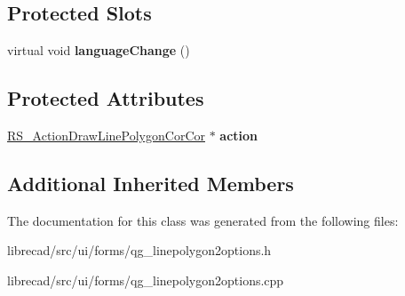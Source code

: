 \subsection*{Protected Slots}
\begin{DoxyCompactItemize}
\item 
\hypertarget{classQG__LinePolygon2Options_a90ab75736f6d2e227e90defa540c2294}{virtual void {\bfseries language\-Change} ()}\label{classQG__LinePolygon2Options_a90ab75736f6d2e227e90defa540c2294}

\end{DoxyCompactItemize}
\subsection*{Protected Attributes}
\begin{DoxyCompactItemize}
\item 
\hypertarget{classQG__LinePolygon2Options_af7e7b39e989aa9dda2ee182799a5fa7a}{\hyperlink{classRS__ActionDrawLinePolygonCorCor}{R\-S\-\_\-\-Action\-Draw\-Line\-Polygon\-Cor\-Cor} $\ast$ {\bfseries action}}\label{classQG__LinePolygon2Options_af7e7b39e989aa9dda2ee182799a5fa7a}

\end{DoxyCompactItemize}
\subsection*{Additional Inherited Members}


The documentation for this class was generated from the following files\-:\begin{DoxyCompactItemize}
\item 
librecad/src/ui/forms/qg\-\_\-linepolygon2options.\-h\item 
librecad/src/ui/forms/qg\-\_\-linepolygon2options.\-cpp\end{DoxyCompactItemize}
